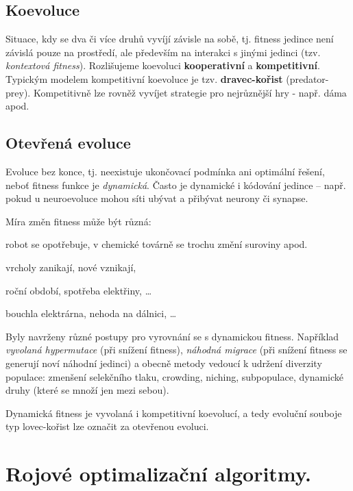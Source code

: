 \subsection{Koevoluce}
Situace, kdy se dva či více druhů vyvíjí závisle na sobě, tj. fitness jedince není závislá pouze na prostředí, ale především na interakci s jinými jedinci (tzv. \textit{kontextová fitness}). Rozlišujeme koevoluci \textbf{kooperativní} a \textbf{kompetitivní}. Typickým modelem kompetitivní koevoluce je tzv. \textbf{dravec-kořist} (predator-prey). Kompetitivně lze rovněž vyvíjet strategie pro nejrůznější hry - např. dáma apod.


\subsection{Otevřená evoluce}
Evoluce bez konce, tj. neexistuje ukončovací podmínka ani optimální řešení, neboť fitness funkce je \textit{dynamická}. Často je dynamické i kódování jedince -- např. pokud u neuroevoluce mohou síti ubývat a přibývat neurony či synapse. 

Míra změn fitness může být různá: 
\begin{description}
	\leftskip 30pt
	\setlength{\itemsep}{0pt}
	\item[malé změny] robot se opotřebuje, v chemické továrně se trochu změní suroviny apod.
	\item[výrazné morfologické změny] vrcholy zanikají, nové vznikají, 
	\item[cyklické změny] roční období, spotřeba elektřiny, \dots
	\item[katastrofické změny] bouchla elektrárna, nehoda na dálnici, \dots
\end{description}

Byly navrženy různé postupy pro vyrovnání se s dynamickou fitness. Například \textit{vyvolaná hypermutace} (při snížení fitness), \textit{náhodná migrace} (při snížení fitness se generují noví náhodní jedinci) a obecně metody vedoucí k udržení diverzity populace: zmenšení selekčního tlaku, crowding, niching, subpopulace, dynamické druhy (které se množí jen mezi sebou).

Dynamická fitness je vyvolaná i kompetitivní koevolucí, a tedy evoluční souboje typ lovec-kořist lze označit za otevřenou evoluci.




\section{Rojové optimalizační algoritmy.}
